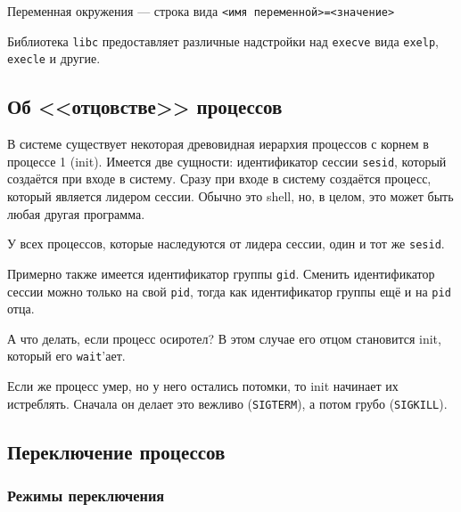 Переменная окружения --- строка вида \verb!<имя переменной>=<значение>!

Библиотека \verb!libc! предоставляет различные надстройки над \verb!execve! вида \verb!exelp!, \verb!execle! и другие.

\subsection{Об <<отцовстве>> процессов}

В системе существует некоторая древовидная иерархия процессов с корнем в процессе 1 (init). Имеется две сущности: идентификатор сессии \verb!sesid!, который создаётся при входе в систему. Сразу при входе в систему создаётся процесс, который является лидером сессии. Обычно это shell, но, в целом, это может быть любая другая программа.

У всех процессов, которые наследуются от лидера сессии, один и тот же \verb!sesid!.

Примерно также имеется идентификатор группы \verb!gid!. Сменить идентификатор сессии можно только на свой \verb!pid!, тогда как идентификатор группы ещё и на \verb!pid! отца.

А что делать, если процесс осиротел? В этом случае его отцом становится init, который его \verb!wait!'ает.

Если же процесс умер, но у него остались потомки, то init начинает их истреблять. Сначала он делает это вежливо (\verb!SIGTERM!), а потом грубо (\verb!SIGKILL!).

\subsection{Переключение процессов}

\subsubsection{Режимы переключения}

